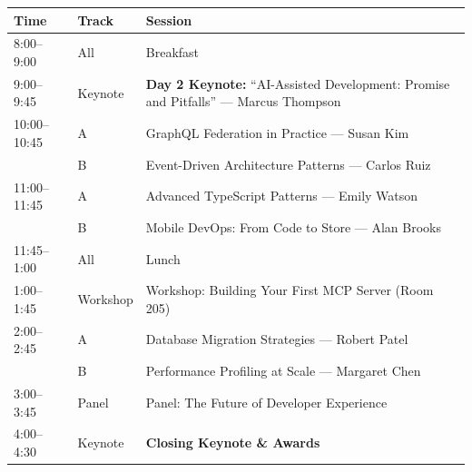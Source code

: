 \documentclass[
    language=english,
    doctype=program,
    institution=none,
]{../../omnilatex}
\begin{document}
\begin{tabularx}{\textwidth}{l l X}
    \toprule
    \textbf{Time} & \textbf{Track} & \textbf{Session} \\
    \midrule
    8:00--9:00   & All      & Breakfast \\
    9:00--9:45   & Keynote  & \textbf{Day 2 Keynote:} ``AI-Assisted Development:
                             Promise and Pitfalls'' --- Marcus Thompson \\
    10:00--10:45 & A        & GraphQL Federation in Practice --- Susan Kim \\
                 & B        & Event-Driven Architecture Patterns --- Carlos Ruiz \\
    11:00--11:45 & A        & Advanced TypeScript Patterns --- Emily Watson \\
                 & B        & Mobile DevOps: From Code to Store --- Alan Brooks \\
    11:45--1:00  & All      & Lunch \\
    1:00--1:45   & Workshop & Workshop: Building Your First MCP Server (Room 205) \\
    2:00--2:45   & A        & Database Migration Strategies --- Robert Patel \\
                 & B        & Performance Profiling at Scale --- Margaret Chen \\
    3:00--3:45   & Panel    & Panel: The Future of Developer Experience \\
    4:00--4:30   & Keynote  & \textbf{Closing Keynote \& Awards} \\
    \bottomrule
\end{tabularx}

\vspace{0.5em}
\end{document}
